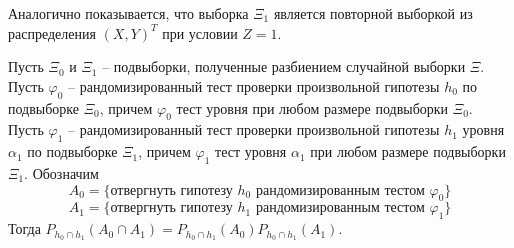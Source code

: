 Аналогично показывается, что выборка $\Xi_1$ является повторной выборкой из распределения $(X,Y)^T$ при условии $Z=1$.

\begin{theorem}\label{main_theorem}
    Пусть $\Xi_0$ и $\Xi_1$ -- подвыборки, полученные разбиением случайной выборки $\Xi$.
    Пусть $\varphi_0$ -- рандомизированный тест проверки произвольной гипотезы $h_0$ по подвыборке $\Xi_0$, причем $\varphi_0$ тест уровня
    при любом размере подвыборки $\Xi_0$.
    Пусть $\varphi_1$ -- рандомизированный тест проверки произвольной гипотезы $h_1$ уровня $\alpha_1$ по подвыборке $\Xi_1$,
    причем $\varphi_1$ тест уровня $\alpha_1$ при любом размере подвыборки $\Xi_1$. Обозначим
    $$A_0 = \{\text{отвергнуть гипотезу $h_0$ рандомизированным тестом $\varphi_0$}\}$$ 
    $$A_1 = \{\text{отвергнуть гипотезу $h_1$ рандомизированным тестом $\varphi_1$}\}$$
    Тогда $P_{h_0\cap h_1}(A_0 \cap A_1)= P_{h_0\cap h_1}(A_0) P_{h_0\cap h_1}(A_1)$.
\end{theorem}
